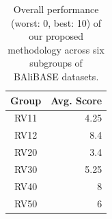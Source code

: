\begin{table}[htbp]
	\centering
	\caption{Overall performance (worst: 0, best: 10) of our proposed methodology across six subgroups of BAliBASE datasets.}
	\begin{tabular}{|c|r|}
		\hline
		Group & \multicolumn{1}{l|}{Avg. Score} \\
		\hline
		RV11  & 4.25 \\
		\hline
		RV12  & 8.4 \\
		\hline
		RV20  & 3.4 \\
		\hline
		RV30  & 5.25 \\
		\hline
		RV40  & 8 \\
		\hline
		RV50  & 6 \\
		\hline
	\end{tabular}%
	\label{tab:insight_group}%
\end{table}%

